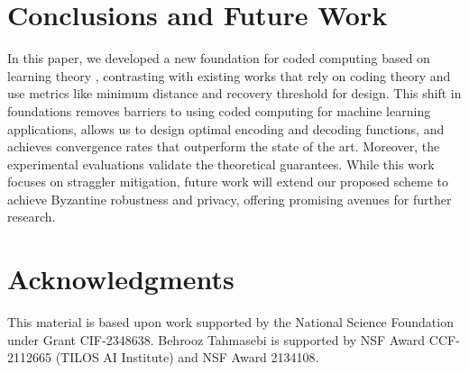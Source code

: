 \documentclass{article}
\begin{document}
\section{Conclusions and Future Work}
In this paper, we developed a new foundation for coded computing based on learning theory%
, contrasting with existing works that rely on coding theory and use metrics like minimum distance and recovery threshold for design.
This shift in foundations removes barriers to using coded computing for machine learning applications, allows us to design optimal encoding and decoding functions, and achieves convergence rates that outperform the state of the art. Moreover, the experimental evaluations validate the theoretical guarantees. While this work focuses on straggler mitigation, future work will extend our proposed scheme to achieve Byzantine robustness and privacy, offering promising avenues for further research.

\section{Acknowledgments}
This material is based upon work supported by the National
Science Foundation under Grant CIF-2348638. Behrooz Tahmasebi is supported by NSF Award CCF-2112665 (TILOS AI Institute) and NSF Award 2134108.


\end{document}
